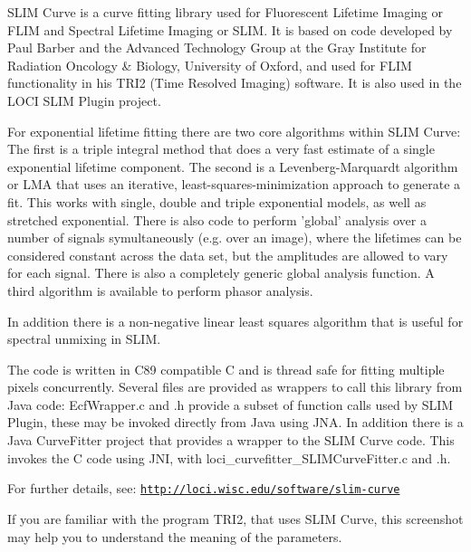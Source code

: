S\-L\-I\-M Curve is a curve fitting library used for Fluorescent Lifetime Imaging or F\-L\-I\-M and Spectral Lifetime Imaging or S\-L\-I\-M. It is based on code developed by Paul Barber and the Advanced Technology Group at the Gray Institute for Radiation Oncology \& Biology, University of Oxford, and used for F\-L\-I\-M functionality in his T\-R\-I2 (Time Resolved Imaging) software. It is also used in the L\-O\-C\-I S\-L\-I\-M Plugin project.

For exponential lifetime fitting there are two core algorithms within S\-L\-I\-M Curve\-: The first is a triple integral method that does a very fast estimate of a single exponential lifetime component. The second is a Levenberg-\/\-Marquardt algorithm or L\-M\-A that uses an iterative, least-\/squares-\/minimization approach to generate a fit. This works with single, double and triple exponential models, as well as stretched exponential. There is also code to perform 'global' analysis over a number of signals symultaneously (e.\-g. over an image), where the lifetimes can be considered constant across the data set, but the amplitudes are allowed to vary for each signal. There is also a completely generic global analysis function. A third algorithm is available to perform phasor analysis.

In addition there is a non-\/negative linear least squares algorithm that is useful for spectral unmixing in S\-L\-I\-M.

The code is written in C89 compatible C and is thread safe for fitting multiple pixels concurrently. Several files are provided as wrappers to call this library from Java code\-: Ecf\-Wrapper.\-c and .h provide a subset of function calls used by S\-L\-I\-M Plugin, these may be invoked directly from Java using J\-N\-A. In addition there is a Java Curve\-Fitter project that provides a wrapper to the S\-L\-I\-M Curve code. This invokes the C code using J\-N\-I, with loci\-\_\-curvefitter\-\_\-\-S\-L\-I\-M\-Curve\-Fitter.\-c and .h.

For further details, see\-: \href{http://loci.wisc.edu/software/slim-curve}{\tt http\-://loci.\-wisc.\-edu/software/slim-\/curve}

If you are familiar with the program T\-R\-I2, that uses S\-L\-I\-M Curve, this screenshot may help you to understand the meaning of the parameters.

